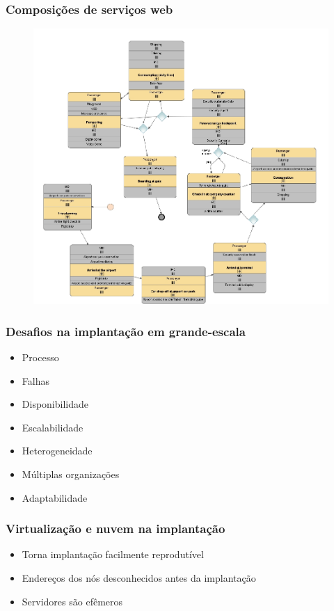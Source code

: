 \documentclass{beamer}
\begin{document}

\begin{frame}
\frametitle{Composições de serviços web}

\begin{figure}
\includegraphics[width=0.7\linewidth]{img/chorwp6}
\end{figure}


\end{frame}


\begin{frame}
\frametitle{Desafios na implantação em grande-escala}

\begin{itemize}
\item Processo
\item Falhas
\item Disponibilidade
\item Escalabilidade
\item Heterogeneidade
\item Múltiplas organizações
\item Adaptabilidade
\end{itemize}

\end{frame}


\begin{frame}
\frametitle{Virtualização e nuvem na implantação}

\begin{itemize}
\item Torna implantação facilmente reprodutível
\item Endereços dos nós desconhecidos antes da implantação
\item Servidores são efêmeros
\end{itemize}


\end{frame}
\end{document}
